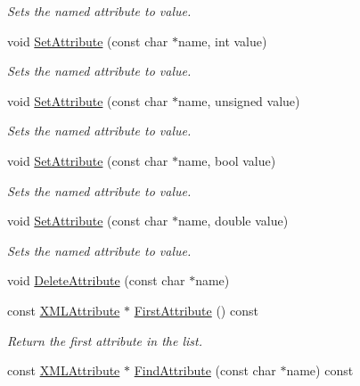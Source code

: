 \begin{DoxyCompactItemize}
\begin{DoxyCompactList}\small\item\em Sets the named attribute to value. \end{DoxyCompactList}\item 
void \hyperlink{classtinyxml2_1_1_x_m_l_element_aae6568c64c7f1cc88be8461ba41a79cf}{Set\-Attribute} (const char $\ast$name, int value)
\begin{DoxyCompactList}\small\item\em Sets the named attribute to value. \end{DoxyCompactList}\item 
void \hyperlink{classtinyxml2_1_1_x_m_l_element_ae143997e90064ba82326b29a9930ea8f}{Set\-Attribute} (const char $\ast$name, unsigned value)
\begin{DoxyCompactList}\small\item\em Sets the named attribute to value. \end{DoxyCompactList}\item 
void \hyperlink{classtinyxml2_1_1_x_m_l_element_aa848b696e6a75e4e545c6da9893b11e1}{Set\-Attribute} (const char $\ast$name, bool value)
\begin{DoxyCompactList}\small\item\em Sets the named attribute to value. \end{DoxyCompactList}\item 
void \hyperlink{classtinyxml2_1_1_x_m_l_element_a233397ee81e70eb5d4b814c5f8698533}{Set\-Attribute} (const char $\ast$name, double value)
\begin{DoxyCompactList}\small\item\em Sets the named attribute to value. \end{DoxyCompactList}\item 
void \hyperlink{classtinyxml2_1_1_x_m_l_element_aebd45aa7118964c30b32fe12e944628a}{Delete\-Attribute} (const char $\ast$name)
\item 
const \hyperlink{classtinyxml2_1_1_x_m_l_attribute}{X\-M\-L\-Attribute} $\ast$ \hyperlink{classtinyxml2_1_1_x_m_l_element_a67593e63558ffda0386699c3e4cc0b2c}{First\-Attribute} () const 
\begin{DoxyCompactList}\small\item\em Return the first attribute in the list. \end{DoxyCompactList}\item 
const \hyperlink{classtinyxml2_1_1_x_m_l_attribute}{X\-M\-L\-Attribute} $\ast$ \hyperlink{classtinyxml2_1_1_x_m_l_element_aaf46b0799ea419e5d070ac9a357de48f}{Find\-Attribute} (const char $\ast$name) const 

\end{DoxyCompactItemize}
